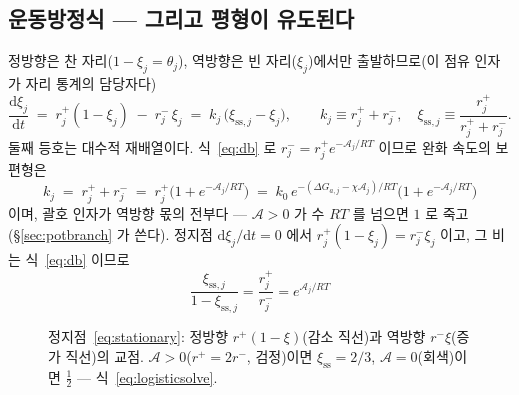 \documentclass[11pt,a4paper]{article}
\newcommand{\dd}{\mathrm{d}}
\newcommand{\sstat}{\mathrm{ss}}
\begin{document}
\subsection{운동방정식 — 그리고 평형이 유도된다}
정방향은 찬 자리($1-\xi_j=\theta_j$), 역방향은 빈 자리($\xi_j$)에서만 출발하므로(이 점유 인자가 자리 통계의 담당자다)
\begin{equation}
\frac{\dd\xi_j}{\dd t}\;=\;r_j^+(1-\xi_j)\;-\;r_j^-\,\xi_j
\;=\;k_j\,\big(\xi_{\sstat,j}-\xi_j\big),\qquad
k_j\equiv r_j^++r_j^-,\quad \xi_{\sstat,j}\equiv\frac{r_j^+}{r_j^++r_j^-}.
\label{eq:relax}
\end{equation}
둘째 등호는 대수적 재배열이다. 식~\eqref{eq:db} 로 $r_j^-=r_j^+e^{-\mathcal A_j/RT}$ 이므로 완화 속도의 보편형은
\begin{equation}
k_j\;=\;r_j^++r_j^-\;=\;r_j^+\big(1+e^{-\mathcal A_j/RT}\big)
\;=\;k_0\,e^{-(\Delta G_{a,j}-\chi\mathcal A_j)/RT}\big(1+e^{-\mathcal A_j/RT}\big)
\label{eq:kuniv}
\end{equation}
이며, 괄호 인자가 역방향 몫의 전부다 — $\mathcal A>0$ 가 수 $RT$ 를 넘으면 $1$ 로 죽고(\S\ref{sec:potbranch} 가 쓴다). 정지점 $\dd\xi_j/\dd t=0$ 에서 $r_j^+(1-\xi_j)=r_j^-\xi_j$ 이고, 그 비는 식~\eqref{eq:db} 이므로
\begin{equation}
\frac{\xi_{\sstat,j}}{1-\xi_{\sstat,j}}=\frac{r_j^+}{r_j^-}=e^{\mathcal A_j/RT}
\label{eq:stationary}
\end{equation}

\begin{figure}[t]
\centering
{}
\caption{정지점~\eqref{eq:stationary}: 정방향 $r^+(1-\xi)$(감소 직선)과 역방향 $r^-\xi$(증가 직선)의 교점. $\mathcal A>0$($r^+=2r^-$, 검정)이면 $\xi_{\sstat}=2/3$, $\mathcal A=0$(회색)이면 $\tfrac12$ — 식~\eqref{eq:logisticsolve}.}
\label{fig:fluxcross}
\end{figure}
\end{document}
